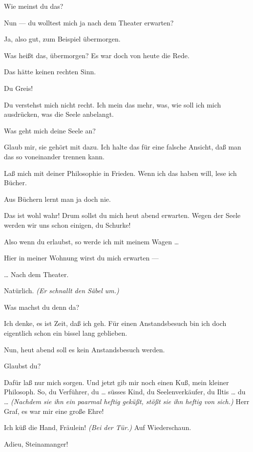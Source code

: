 \documentclass[
	final,
	a4paper,
	ngerman,
	mpinclude = true, %
	twoside = true,
	open = right,
	cleardoublepage = plain,
	DIV = 13,
	BCOR = 1cm,
	titlepage = firstiscover,
	]{scrbook}
\newcommand{\direction}[1]{\textit{(#1)}}
\newcommand{\thecharacter}[1]{\textup{\textsc{#1}}\xspace}
\newcommand{\theschauspielerin}{\thecharacter{Schauspielerin}}
\newcommand{\thegraf}{\thecharacter{Graf}}
\newcommand{\character}[1]{\item[#1:]}
\newcommand{\schauspielerin}{\character{\theschauspielerin}}
\newcommand{\graf}{\character{\thegraf}}
\begin{document}
\begin{play}
	\graf
	Wie meinst du das?

	\schauspielerin
	Nun --- du wolltest mich ja nach dem Theater erwarten?

	\graf
	Ja, also gut, zum Beispiel übermorgen.

	\schauspielerin
	Was heißt das, übermorgen? Es war doch von heute die Rede.

	\graf
	Das hätte keinen rechten Sinn.

	\schauspielerin
	Du Greis!

	\graf
	Du verstehst mich nicht recht. Ich mein das mehr, was, wie soll ich mich ausdrücken, was die Seele anbelangt.

	\schauspielerin
	Was geht mich deine Seele an?

	\graf
	Glaub mir, sie gehört mit dazu. Ich halte das für eine falsche Ansicht, daß man das so voneinander trennen kann.

	\schauspielerin
	Laß mich mit deiner Philosophie in Frieden. Wenn ich das haben will, lese ich Bücher.

	\graf
	Aus Büchern lernt man ja doch nie.

	\schauspielerin
	Das ist wohl wahr! Drum sollst du mich heut abend erwarten. Wegen der Seele werden wir uns schon einigen, du Schurke!

	\graf
	Also wenn du erlaubst, so werde ich mit meinem Wagen \ldots{}

	\schauspielerin
	Hier in meiner Wohnung wirst du mich erwarten ---

	\graf
	\ldots{} Nach dem Theater.

	\schauspielerin
	Natürlich. \direction{Er schnallt den Säbel um.}

	\schauspielerin
	Was machst du denn da?

	\graf
	Ich denke, es ist Zeit, daß ich geh. Für einen Anstandsbesuch bin ich doch eigentlich schon ein bissel lang geblieben.

	\schauspielerin
	Nun, heut abend soll es kein Anstandsbesuch werden.

	\graf
	Glaubst du?

	\schauspielerin
	Dafür laß nur mich sorgen. Und jetzt gib mir noch einen Kuß, mein kleiner Philosoph. So, du Verführer, du \ldots{} süsses Kind, du Seelenverkäufer, du Iltis \ldots{} du \ldots{} \direction{Nachdem sie ihn ein paarmal heftig geküßt, stößt sie ihn heftig von sich.} Herr Graf, es war mir eine große Ehre!

	\graf
	Ich küß die Hand, Fräulein! \direction{Bei der Tür.} Auf Wiederschaun.

	\schauspielerin
	Adieu, Steinamanger!

\end{play}
\end{document}
